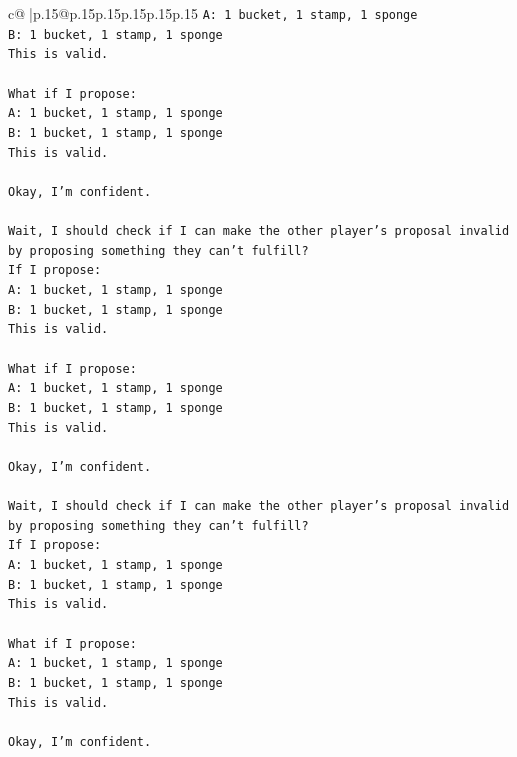 \documentclass{article}
\begin{document}
{\begin{supertabular}{c@{$\;$}|p{.15\linewidth}@{}p{.15\linewidth}p{.15\linewidth}p{.15\linewidth}p{.15\linewidth}p{.15\linewidth}}
{{{\texttt{A: 1 bucket, 1 stamp, 1 sponge} \\
\texttt{B: 1 bucket, 1 stamp, 1 sponge} \\
\texttt{This is valid.} \\
\\ 
\texttt{What if I propose:} \\
\texttt{A: 1 bucket, 1 stamp, 1 sponge} \\
\texttt{B: 1 bucket, 1 stamp, 1 sponge} \\
\texttt{This is valid.} \\
\\ 
\texttt{Okay, I'm confident.} \\
\\ 
\texttt{Wait, I should check if I can make the other player's proposal invalid by proposing something they can't fulfill?} \\
\texttt{If I propose:} \\
\texttt{A: 1 bucket, 1 stamp, 1 sponge} \\
\texttt{B: 1 bucket, 1 stamp, 1 sponge} \\
\texttt{This is valid.} \\
\\ 
\texttt{What if I propose:} \\
\texttt{A: 1 bucket, 1 stamp, 1 sponge} \\
\texttt{B: 1 bucket, 1 stamp, 1 sponge} \\
\texttt{This is valid.} \\
\\ 
\texttt{Okay, I'm confident.} \\
\\ 
\texttt{Wait, I should check if I can make the other player's proposal invalid by proposing something they can't fulfill?} \\
\texttt{If I propose:} \\
\texttt{A: 1 bucket, 1 stamp, 1 sponge} \\
\texttt{B: 1 bucket, 1 stamp, 1 sponge} \\
\texttt{This is valid.} \\
\\ 
\texttt{What if I propose:} \\
\texttt{A: 1 bucket, 1 stamp, 1 sponge} \\
\texttt{B: 1 bucket, 1 stamp, 1 sponge} \\
\texttt{This is valid.} \\
\\ 
\texttt{Okay, I'm confident.} \\
}}}
\end{supertabular}}
\end{document}
